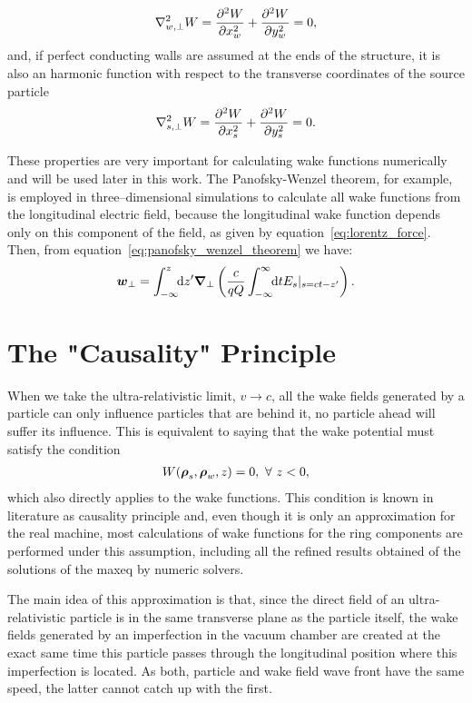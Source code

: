    \begin{align}\label{eq:potential_harmonic}
  	  	\nabla^2_{w,\perp} W = \derpar[2]{W}{x_w} + \derpar[2]{W}{y_w} = 0,
    \end{align}
    and, if perfect conducting walls are assumed at the ends of the structure, it is also an harmonic function with respect to the transverse coordinates of the source particle~\cite{Zagorodnov2015}
    \begin{align}\label{eq:potential_harmonic_source}
  	  	\nabla^2_{s,\perp} W = \derpar[2]{W}{x_s} + \derpar[2]{W}{y_s} = 0.
    \end{align}

    These properties are very important for calculating wake functions numerically and will be used later in this work. The Panofsky-Wenzel theorem, for example, is employed in three--dimensional simulations to calculate all wake functions from the longitudinal electric field, because the longitudinal wake function depends only on this component of the field, as given by equation~\eqref{eq:lorentz_force}. Then, from equation~\eqref{eq:panofsky_wenzel_theorem} we have:
    \begin{align}
  	  	\vect{w}_\perp = \defint{z'}{\vect{\nabla}_\perp\left(\frac{c}{qQ}\infint{t}{E_s|_{s=ct-z'}}\right)}{-\infty}{z}.
    \end{align}

\section{The "Causality" Principle}

    When we take the ultra-relativistic limit, $v \to c$, all the wake fields generated by a particle can only influence particles that are behind it, no particle ahead will suffer its influence. This is equivalent to saying that the wake potential must satisfy the condition
    \begin{align}
  	  	W(\vect{\rho}_s, \vect{\rho}_w, z) = 0, \,\,  \forall\,\, z < 0,
    \end{align}
    which also directly applies to the wake functions. This condition is known in literature as causality principle and, even though it is only an approximation for the real machine, most calculations of wake functions for the ring components are performed under this assumption, including all the refined results obtained of the solutions of the \gls{maxeq} by numeric solvers.

    The main idea of this approximation is that, since the direct field of an ultra-relativistic particle is in the same transverse plane as the particle itself, the wake fields generated by an imperfection in the vacuum chamber are created at the exact same time this particle passes through the longitudinal position where this imperfection is located. As both, particle and wake field wave front have the same speed, the latter cannot catch up with the first.

